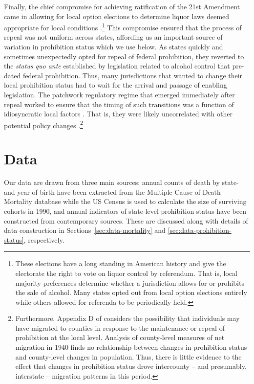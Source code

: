 \documentclass[12pt]{article}
\begin{document}
Finally, the chief compromise for achieving ratification of the 21st Amendment came in allowing for local option elections to determine liquor laws deemed appropriate for local conditions .\footnote{These elections have a long standing in American history and give the electorate the right to vote on liquor control by referendum. 
That is, local majority preferences determine whether a jurisdiction allows for or prohibits the sale of alcohol. 
Many states opted out from local option elections entirely while others allowed for referenda to be periodically held.} 
This compromise ensured that the process of repeal was not uniform across states, affording us an important source of variation in prohibition status which we use below. 
As states quickly and sometimes unexpectedly opted for repeal of federal prohibition, they reverted to the \emph{status quo ante} established by legislation related to alcohol control that pre-dated federal prohibition. 
Thus, many jurisdictions that wanted to change their local prohibition status had to wait for the arrival and passage of enabling legislation. 
The patchwork regulatory regime that emerged immediately after repeal worked to ensure that the timing of such transitions was a function of idiosyncratic local factors . 
That is, they were likely uncorrelated with other potential policy changes .\footnote{Furthermore, Appendix D of  considers the possibility that individuals may have migrated to counties in response to the maintenance or repeal of prohibition at the local level. 
Analysis of county-level measures of net migration in 1940 finds no relationship between changes in prohibition status and county-level changes in population. 
Thus, there is little evidence to the effect that changes in prohibition status drove intercounty -- and presumably, interstate -- migration patterns in this period.
}


\section{Data} \label{sec:data}

Our data are drawn from three main sources: annual counts of death by state- and year-of birth have been extracted from the Multiple Cause-of-Death Mortality database while the US Census is used to calculate the size of surviving cohorts in 1990, and annual indicators of state-level prohibition status have been constructed from contemporary sources. 
These are discussed along with details of data construction in Sections~\ref{sec:data-mortality} and \ref{sec:data-prohibition-status}, respectively. 
\end{document}
